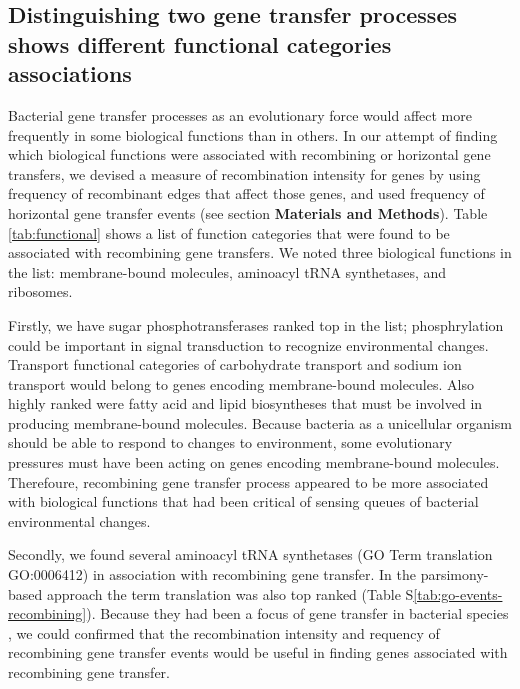 \documentclass[10pt]{article}
\let\citep\cite
\begin{document}
%
\subsection*{Distinguishing two gene transfer processes shows different functional
categories associations}

Bacterial gene transfer processes as an evolutionary force would affect more
frequently in some biological functions than in others.  In our attempt of
finding which biological functions were associated with recombining or
horizontal gene transfers, we devised a measure of recombination intensity for
genes by using frequency of recombinant edges that affect those genes, and used
frequency of horizontal gene transfer events (see section \textbf{Materials and
Methods}).  Table \ref{tab:functional} shows a list of function categories
that were found to be associated with recombining gene transfers. We noted three
biological functions in the list: membrane-bound molecules, aminoacyl tRNA
synthetases, and ribosomes.

Firstly, we have sugar phosphotransferases ranked
top in the list; phosphrylation could be important in signal transduction to
recognize environmental changes.  Transport functional categories of
carbohydrate transport and sodium ion transport would belong to genes encoding
membrane-bound molecules.  Also highly ranked were fatty acid and lipid
biosyntheses that must be involved in producing membrane-bound molecules. 
Because bacteria as a unicellular organism should be able to respond to changes
to environment, some evolutionary pressures must have been acting on genes
encoding membrane-bound molecules. Therefoure, recombining gene transfer process
appeared to be more associated with biological functions that had been critical
of sensing queues of bacterial environmental changes. 

Secondly, we found several aminoacyl tRNA synthetases (GO Term translation
GO:0006412) in association with recombining gene transfer.  In the
parsimony-based approach the term translation was also top ranked (Table
S\ref{tab:go-events-recombining}).  Because they had been a focus of gene
transfer in bacterial species \citep{Woese2000}, we could confirmed that the
recombination intensity and requency of recombining gene transfer events would
be useful in finding genes associated with recombining gene transfer.
\end{document}
